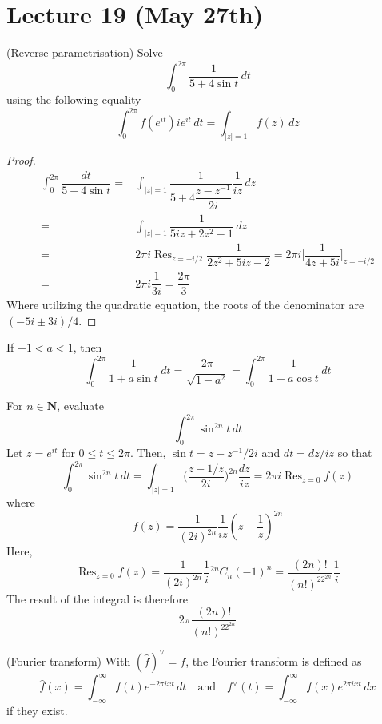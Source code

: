 \section{Lecture 19 (May 27th)}
\begin{ex}
(Reverse parametrisation) Solve
\[\int ^{2\pi }_{0}\dfrac{1}{5+4\sin t}\,dt\]
using the following equality
\[\int _{0}^{2\pi }f(e^{it})ie^{it}\,dt=\int _{|z|=1}f(z)\,dz\]
\end{ex}
\vspace{2ex}
\begin{proof}
\begin{align*}
\int ^{2\pi }_{0}\dfrac{dt}{5+4\sin t}=&\int _{|z|=1}\dfrac{1}{5+4\dfrac{z-z^{-1}}{2i}}\dfrac{1}{iz}\,dz\\
=&\int _{|z|=1}\dfrac{1}{5iz+2z^2-1}\,dz\\
=&2\pi i\mathop{\mathrm{Res}}_{z=-i/2}\dfrac{1}{2z^2+5iz-2}=2\pi i\Big[\dfrac{1}{4z+5i}\Big]_{z=-i/2}\\
=&2\pi i\dfrac{1}{3i}=\dfrac{2\pi}{3}
\end{align*}
Where utilizing the quadratic equation, the roots of the denominator are $(-5i\pm 3i)/4$. 
\end{proof}
\vspace{2ex}
\begin{ex}
If $-1<a<1$, then
\[\int ^{2\pi }_{0}\dfrac{1}{1+a\sin t}\,dt=\dfrac{2\pi }{\sqrt{1-a^2}}=\int ^{2\pi }_{0}\dfrac{1}{1+a\cos t}\,dt\]
\end{ex}
\vspace{2ex}
\begin{ex}
For $n\in {\bm N}$, evaluate 
\[\int _{0}^{2\pi }\sin^{2n}t\,dt\]
Let $z=e^{it}$ for $0\leq t\leq 2\pi $. Then, $\sin t=z-z^{-1}/2i$ and $dt=dz/iz$ so that 
\[\int ^{2\pi }_{0}\sin ^{2n}t\,dt=\int_{|z|=1}\Big(\dfrac{z-1/z}{2i}\Big)^{2n}\dfrac{dz}{iz}=2\pi i\mathop{\mathrm{Res}}_{z=0}f(z)\]
where
\[f(z)=\dfrac{1}{(2i)^{2n}}\dfrac{1}{iz}(z-\dfrac{1}{z})^{2n}\]
Here, 
\[\mathop{\mathrm{Res}}_{z=0}f(z)=\dfrac{1}{(2i)^{2n}}\dfrac{1}{i}{}^{2n}C_{n}(-1)^{n}=\dfrac{(2n)!}{(n!)^22^{2n}}\dfrac{1}{i}\]
The result of the integral is therefore
\[2\pi \dfrac{(2n)!}{(n!)^22^{2n}}\]
\end{ex}
\vspace{2ex}
\begin{defi}
(Fourier transform) With $(\hat{f})^{\vee}=f$, the Fourier transform is defined as 
\[\widehat{f}(x)=\int ^{\infty }_{-\infty }f(t)e^{-2\pi i xt}\,dt\quad \mathrm{and}\quad f^{\vee}(t)=\int ^{\infty }_{-\infty }f(x)e^{2\pi i xt}\,dx\]
if they exist.
\end{defi}
